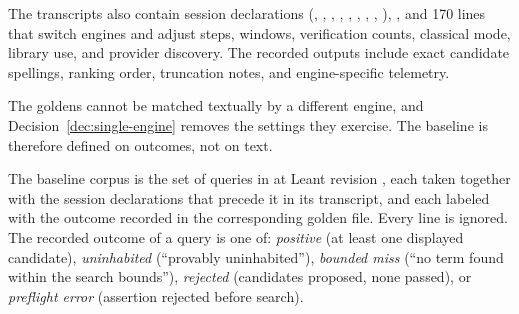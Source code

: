 The transcripts also contain session declarations (, , , , , , , , ), , and 170  lines that switch engines and adjust steps, windows, verification counts, classical mode, library use, and provider discovery. The recorded outputs include exact candidate spellings, ranking order, truncation notes, and engine-specific telemetry.

The goldens cannot be matched textually by a different engine, and Decision~\ref{dec:single-engine} removes the settings they exercise. The baseline is therefore defined on outcomes, not on text.

\begin{definition}\label{def:corpus}
The baseline corpus is the set of  queries in  at Leant revision , each taken together with the session declarations that precede it in its transcript, and each labeled with the outcome recorded in the corresponding golden file. Every  line is ignored. The recorded outcome of a query is one of: \emph{positive} (at least one displayed candidate), \emph{uninhabited} (``provably uninhabited''), \emph{bounded miss} (``no term found within the search bounds''), \emph{rejected} (candidates proposed, none passed), or \emph{preflight error} (assertion rejected before search).
\end{definition}

